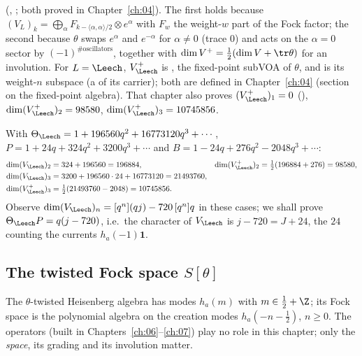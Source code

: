 (, ;
both proved in Chapter~\ref{ch:04}). The first holds because $(V_L)_k =
\bigoplus_\alpha F_{k-\langle\alpha,\alpha\rangle/2}\otimes e^\alpha$ with $F_w$ the weight-$w$ part of the Fock
factor; the second because $\theta$ swaps $e^{\alpha}$ and $e^{-\alpha}$ for $\alpha\ne0$ (trace $0$) and
acts on the $\alpha = 0$ sector by $(-1)^{\#\text{oscillators}}$, together with $\dim V^+ = \tfrac12(\dim V +
\tr\theta)$ for an involution. For $L = \Leech$, $V_\Leech^+$ is , the
fixed-point subVOA of $\theta$, and  is its weight-$n$ subspace (a
 of its carrier); both are defined in Chapter~\ref{ch:04} (section on the fixed-point algebra). That chapter also proves $(V_\Leech^+)_1 = 0$
(), $\dim(V_\Leech^+)_2 = 98580$, $\dim(V_\Leech^+)_3 = 10745856$.

\begin{example}\label{ch05:ex:vplus}
With $\Theta_\Leech = 1 + 196560q^2+16773120q^3+\cdots$, $P = 1 + 24q + 324q^2 + 3200q^3+\cdots$ and $B =
1 - 24q + 276q^2 - 2048q^3+\cdots$:
\begin{align*}
  \dim(V_\Leech)_2 &= 324 + 196560 = 196884, &
  \dim(V_\Leech^+)_2 &= \tfrac12(196884 + 276) = 98580,\\
  \dim(V_\Leech)_3 &= 3200 + 196560\cdot24 + 16773120 = 21493760,\\
  \dim(V_\Leech^+)_3 &= \tfrac12(21493760 - 2048) = 10745856.
\end{align*}
Observe $\dim(V_\Leech)_n = [q^n](qj) - 720\,[q^n]q$ in these cases; we shall prove $\Theta_\Leech P =
q(j-720)$, i.e.\ the character of $V_\Leech$ is $j - 720 = J + 24$, the $24$ counting the currents
$h_a(-1)\mathbf 1$.
\end{example}

\subsection{The twisted Fock space \texorpdfstring{$S[\theta]$}{S[theta]}}

The $\theta$-twisted Heisenberg algebra has modes $h_a(m)$ with $m\in\tfrac12+\Z$; its Fock space is the
polynomial algebra on the creation modes $h_a(-n-\tfrac12)$, $n\ge0$. The operators (built in
Chapters~\ref{ch:06}--\ref{ch:07}) play no role in this chapter; only the \emph{space}, its grading
and its involution matter.


